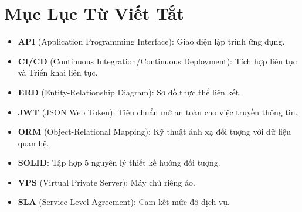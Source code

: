 \chapter*{Mục Lục Từ Viết Tắt}

\begin{itemize}
    \item \textbf{API} (Application Programming Interface): Giao diện lập trình ứng dụng.
    \item \textbf{CI/CD} (Continuous Integration/Continuous Deployment): Tích hợp liên tục và Triển khai liên tục.
    \item \textbf{ERD} (Entity-Relationship Diagram): Sơ đồ thực thể liên kết.
    \item \textbf{JWT} (JSON Web Token): Tiêu chuẩn mở an toàn cho việc truyền thông tin.
    \item \textbf{ORM} (Object-Relational Mapping): Kỹ thuật ánh xạ đối tượng với dữ liệu quan hệ.
    \item \textbf{SOLID}: Tập hợp 5 nguyên lý thiết kế hướng đối tượng.
    \item \textbf{VPS} (Virtual Private Server): Máy chủ riêng ảo.
    \item \textbf{SLA} (Service Level Agreement): Cam kết mức độ dịch vụ.
\end{itemize}
